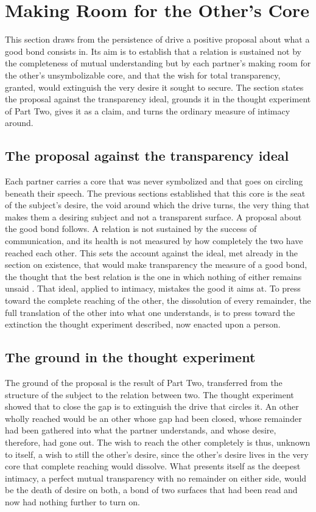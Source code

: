 \section{Making Room for the Other's Core}
\label{p26:sec:room}

\noindent
This section draws from the persistence of drive a positive proposal about what a good bond consists in. Its aim is to establish that a relation is sustained not by the completeness of mutual understanding but by each partner's making room for the other's unsymbolizable core, and that the wish for total transparency, granted, would extinguish the very desire it sought to secure. The section states the proposal against the transparency ideal, grounds it in the thought experiment of Part Two, gives it as a claim, and turns the ordinary measure of intimacy around.

\subsection*{The proposal against the transparency ideal}

Each partner carries a core that was never symbolized and that goes on circling beneath their speech. The previous sections established that this core is the seat of the subject's desire, the void around which the drive turns, the very thing that makes them a desiring subject and not a transparent surface. A proposal about the good bond follows. A relation is not sustained by the success of communication, and its health is not measured by how completely the two have reached each other. This sets the account against the ideal, met already in the section on existence, that would make transparency the measure of a good bond, the thought that the best relation is the one in which nothing of either remains unsaid \parencite{habermas1984theory}. That ideal, applied to intimacy, mistakes the good it aims at. To press toward the complete reaching of the other, the dissolution of every remainder, the full translation of the other into what one understands, is to press toward the extinction the thought experiment described, now enacted upon a person.

\subsection*{The ground in the thought experiment}

The ground of the proposal is the result of Part Two, transferred from the structure of the subject to the relation between two. The thought experiment showed that to close the gap is to extinguish the drive that circles it. An other wholly reached would be an other whose gap had been closed, whose remainder had been gathered into what the partner understands, and whose desire, therefore, had gone out. The wish to reach the other completely is thus, unknown to itself, a wish to still the other's desire, since the other's desire lives in the very core that complete reaching would dissolve. What presents itself as the deepest intimacy, a perfect mutual transparency with no remainder on either side, would be the death of desire on both, a bond of two surfaces that had been read and now had nothing further to turn on.

